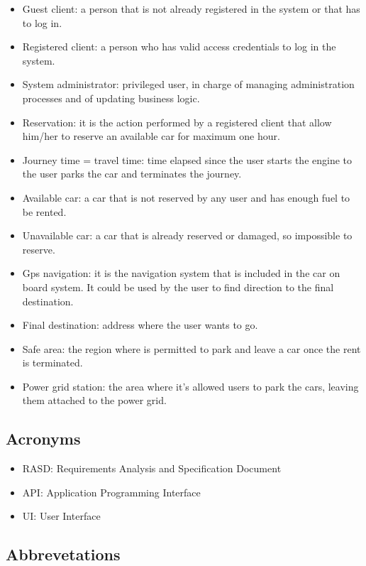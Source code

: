 \begin{itemize}
\item Guest client: a person that is not already registered in the system or that has to log in.
\item Registered client: a person who has valid access credentials to log in the system.
\item System administrator: privileged user, in charge of managing administration processes and of updating business logic.
\item Reservation: it is the action performed by a registered client that allow him/her to reserve an available car for maximum one hour.
\item Journey time = travel time: time elapsed since the user starts the engine to the user parks the car and terminates the journey.
\item Available car: a car that is not reserved by any user and has enough fuel to be rented.
\item Unavailable car: a car that is already reserved or damaged, so impossible to reserve.
\item Gps navigation: it is the navigation system that is included in the car on board system. It could be used by the user to find direction to the final destination.
\item Final destination: address where the user wants to go.
\item Safe area: the region where is permitted to park and leave a car once the rent is terminated.
\item Power grid station: the area where it’s allowed users to park the cars, leaving them attached to the power grid.
\end{itemize}

\subsection{Acronyms}

\begin{itemize}
\item RASD: Requirements Analysis and Specification Document
\item API: Application Programming Interface
\item UI: User Interface
\end{itemize}

\subsection{Abbrevetations}

